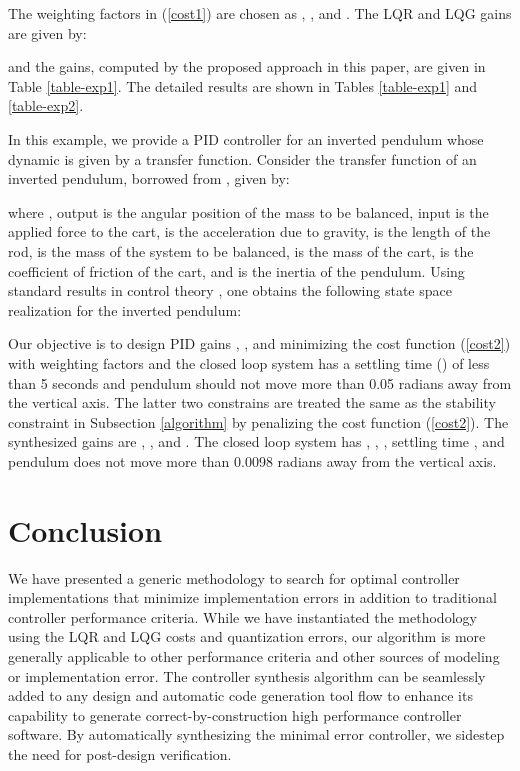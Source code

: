 \documentclass{amsart}
\numberwithin{equation}{section}
\def\myparagraph#1{{\smallskip\noindent{\bf #1}}}
\begin{document}
The weighting factors in (\ref{cost1}) are chosen as , , and . The LQR and LQG gains are given by:  

and the gains, computed by the proposed approach in this paper, are given in Table \ref{table-exp1}. The detailed results are shown in Tables \ref{table-exp1} and \ref{table-exp2}. 

\myparagraph{PID controller}
In this example, we provide a PID controller for an inverted pendulum whose dynamic is given by a transfer function. Consider the transfer function of an inverted pendulum, borrowed from \cite{cmu_examples}, given by:

where , output  is the angular position of the mass to be balanced, input  is the applied force to the cart,  is the acceleration due to gravity,  is the length of the rod,  is the mass of the system to be balanced,  is the mass of the cart,  is the coefficient of friction of the cart, and  is the inertia of the pendulum. Using standard results in control theory \cite{kailath}, one obtains the following state space realization for the inverted pendulum:
  

Our objective is to design PID gains , , and  minimizing the cost function (\ref{cost2}) with weighting factors  and the closed loop system has a settling time () of less than 5 seconds and pendulum should not move more than 0.05 radians away from the vertical axis. The latter two constrains are treated the same as the stability constraint in Subsection \ref{algorithm} by penalizing the cost function (\ref{cost2}). The synthesized gains are , , and . The closed loop system has , , , settling time , and pendulum does not move more than 0.0098 radians away from the vertical axis.

\section{Conclusion}

We have presented a generic methodology to search for optimal controller implementations that
minimize implementation errors in addition to traditional controller performance criteria.
While we have instantiated the methodology using the LQR and LQG costs and quantization errors, our algorithm
is more generally applicable to other performance criteria and other sources of modeling or implementation error.
The controller synthesis algorithm can be seamlessly added to any design and automatic code generation tool flow
to enhance its capability to generate correct-by-construction high performance controller software. 
By automatically synthesizing the minimal error controller, we sidestep the need for post-design verification.



\end{document}
